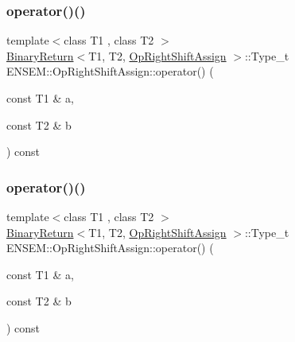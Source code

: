 \subsubsection{\texorpdfstring{operator()()}{operator()()}\hspace{0.1cm}{\footnotesize\ttfamily [1/3]}}
{\footnotesize\ttfamily template$<$class T1 , class T2 $>$ \\
\mbox{\hyperlink{structENSEM_1_1BinaryReturn}{Binary\+Return}}$<$T1, T2, \mbox{\hyperlink{structENSEM_1_1OpRightShiftAssign}{Op\+Right\+Shift\+Assign}} $>$\+::Type\+\_\+t E\+N\+S\+E\+M\+::\+Op\+Right\+Shift\+Assign\+::operator() (\begin{DoxyParamCaption}\item[{const T1 \&}]{a,  }\item[{const T2 \&}]{b }\end{DoxyParamCaption}) const\hspace{0.3cm}{\ttfamily [inline]}}

\mbox{\label{structENSEM_1_1OpRightShiftAssign_a9ff0eba54a134afd57441ec8450a745e}} 
\subsubsection{\texorpdfstring{operator()()}{operator()()}\hspace{0.1cm}{\footnotesize\ttfamily [2/3]}}
{\footnotesize\ttfamily template$<$class T1 , class T2 $>$ \\
\mbox{\hyperlink{structENSEM_1_1BinaryReturn}{Binary\+Return}}$<$T1, T2, \mbox{\hyperlink{structENSEM_1_1OpRightShiftAssign}{Op\+Right\+Shift\+Assign}} $>$\+::Type\+\_\+t E\+N\+S\+E\+M\+::\+Op\+Right\+Shift\+Assign\+::operator() (\begin{DoxyParamCaption}\item[{const T1 \&}]{a,  }\item[{const T2 \&}]{b }\end{DoxyParamCaption}) const\hspace{0.3cm}{\ttfamily [inline]}}

\mbox{\label{structENSEM_1_1OpRightShiftAssign_a9ff0eba54a134afd57441ec8450a745e}} 
